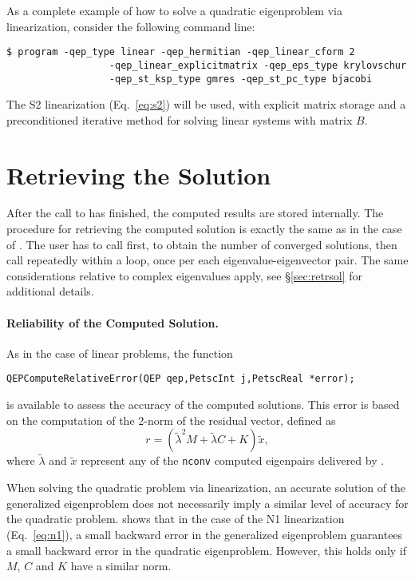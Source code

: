 As a complete example of how to solve a quadratic eigenproblem via linearization, consider the following command line:
\begin{Verbatim}[fontsize=\small]
	$ program -qep_type linear -qep_hermitian -qep_linear_cform 2
                  -qep_linear_explicitmatrix -qep_eps_type krylovschur
                  -qep_st_ksp_type gmres -qep_st_pc_type bjacobi
\end{Verbatim}
The S2 linearization (Eq.\ \ref{eq:s2}) will be used, with explicit matrix storage and a preconditioned iterative method for solving linear systems with matrix $B$.

\section{Retrieving the Solution}

After the call to  has finished, the computed results are stored internally. The procedure for retrieving the computed solution is exactly the same as in the case of . The user has to call  first, to obtain the number of converged solutions, then call  repeatedly within a loop, once per each eigenvalue-eigenvector pair. The same considerations relative to complex eigenvalues apply, see \S\ref{sec:retrsol} for additional details.

\paragraph{Reliability of the Computed Solution.}

As in the case of linear problems, the function
	\begin{Verbatim}[fontsize=\small]
	QEPComputeRelativeError(QEP qep,PetscInt j,PetscReal *error);
	\end{Verbatim}
is available to assess the accuracy of the computed solutions. This error is based on the computation of the 2-norm of the residual vector, defined as
\begin{equation}
r=(\tilde{\lambda}^2M+\tilde{\lambda} C+K)\tilde{x},\label{eq:resquad}
\end{equation}
where $\tilde{\lambda}$ and $\tilde{x}$ represent any of the \texttt{nconv} computed eigenpairs delivered by .

When solving the quadratic problem via linearization, an accurate solution of the generalized eigenproblem does not necessarily imply a similar level of accuracy for the quadratic problem. \cite{Tisseur:2000:BEC} shows that in the case of the N1 linearization (Eq.\ \ref{eq:n1}), a small backward error in the generalized eigenproblem guarantees a small backward error in the quadratic eigenproblem. However, this holds only if $M$, $C$ and $K$ have a similar norm.

